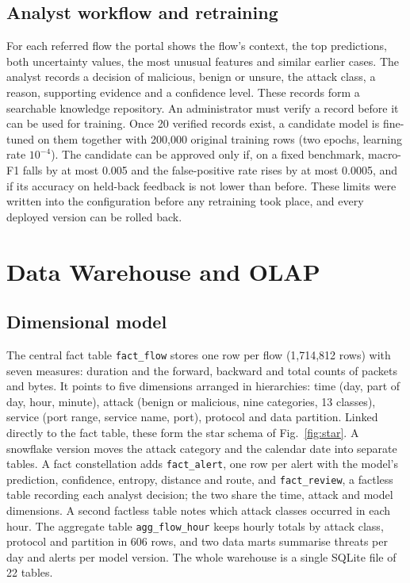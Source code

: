 \documentclass[conference]{IEEEtran}
\begin{document}
\subsection{Analyst workflow and retraining}
For each referred flow the portal shows the flow's context, the top predictions, both
uncertainty values, the most unusual features and similar earlier cases. The analyst records a
decision of malicious, benign or unsure, the attack class, a reason, supporting evidence and a
confidence level. These records form a searchable knowledge repository. An administrator must
verify a record before it can be used for training. Once 20 verified records exist, a candidate
model is fine-tuned on them together with 200,000 original training rows (two epochs, learning
rate $10^{-4}$). The candidate can be approved only if, on a fixed benchmark, macro-F1 falls by
at most 0.005 and the false-positive rate rises by at most 0.0005, and if its accuracy on
held-back feedback is not lower than before. These limits were written into the configuration
before any retraining took place, and every deployed version can be rolled back.

\section{Data Warehouse and OLAP}
\subsection{Dimensional model}
The central fact table \texttt{fact\_flow} stores one row per flow (1,714,812 rows) with seven
measures: duration and the forward, backward and total counts of packets and bytes. It points to
five dimensions arranged in hierarchies: time (day, part of day, hour, minute), attack (benign or
malicious, nine categories, 13 classes), service (port range, service name, port), protocol and
data partition. Linked directly to the fact table, these form the star schema of
Fig.~\ref{fig:star}. A snowflake version moves the attack category and the calendar date into
separate tables. A fact constellation adds \texttt{fact\_alert}, one row per alert with the model's
prediction, confidence, entropy, distance and route, and \texttt{fact\_review}, a factless table
recording each analyst decision; the two share the time, attack and model dimensions. A second
factless table notes which attack classes occurred in each hour. The aggregate table
\texttt{agg\_flow\_hour} keeps hourly totals by attack class, protocol and partition in 606 rows,
and two data marts summarise threats per day and alerts per model version. The whole warehouse is
a single SQLite file of 22 tables.
\end{document}
